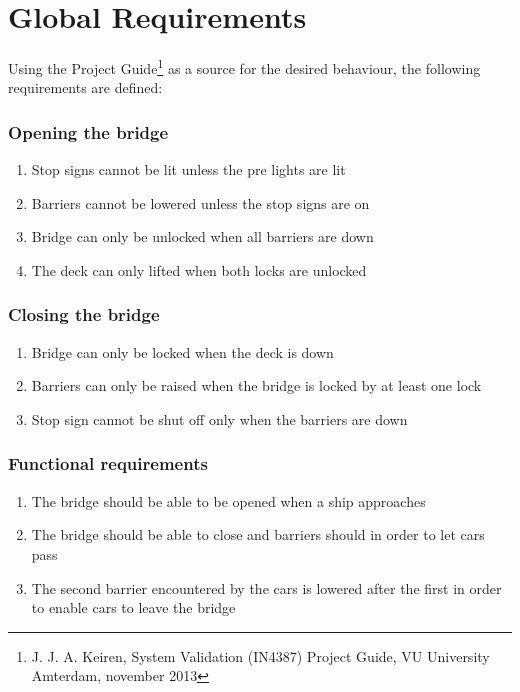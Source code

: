 \section{Global Requirements}
\label{sec:glob}

Using the Project Guide\footnote{J. J. A. Keiren, System Validation (IN4387)
Project Guide, VU University Amterdam, november 2013} as a source for the
desired behaviour, the following requirements are defined:

\subsubsection*{Opening the bridge}
\begin{enumerate}
	\item Stop signs cannot be lit unless the pre lights are lit
	\item Barriers cannot be lowered unless the stop signs are on
	\item Bridge can only be unlocked when all barriers are down
	\item The deck can only lifted when both locks are unlocked
	\setcounter{enumTemp}{\theenumi}
\end{enumerate}

\subsubsection*{Closing the bridge}
\begin{enumerate}
	\setcounter{enumi}{\theenumTemp}
	\item Bridge can only be locked when the deck is down
	\item Barriers can only be raised when the bridge is locked by at least one
	      lock
	\item Stop sign cannot be shut off only when the barriers are down
	\setcounter{enumTemp}{\theenumi}
\end{enumerate}

\subsubsection*{Functional requirements}
\begin{enumerate}
	\setcounter{enumi}{\theenumTemp}
	\item The bridge should be able to be opened when a ship approaches
	\item The bridge should be able to close and barriers should in order to
	      let cars pass
	\item The second barrier encountered by the cars is lowered after
	      the first in order to enable cars to leave the bridge
	\setcounter{enumTemp}{\theenumi}
\end{enumerate}

